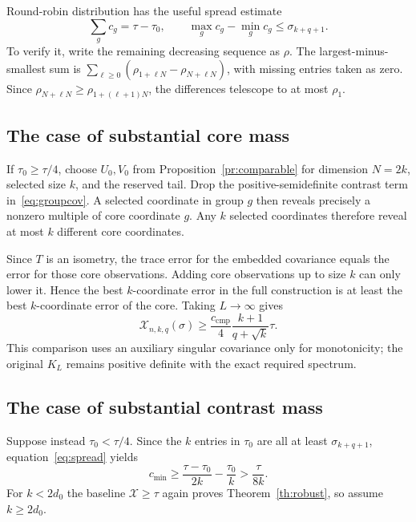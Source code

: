 \documentclass[11pt]{article}
\theoremstyle{remark}\newtheorem{remark}[theorem]{Remark}
\newcommand{\X}{\mathcal X}
\begin{document}
Round-robin distribution has the useful spread estimate
\begin{equation}\label{eq:spread}
 \sum_g c_g=\tau-\tau_0,
 \qquad \max_g c_g-\min_g c_g\le\sigma_{k+q+1}.
\end{equation}
To verify it, write the remaining decreasing sequence as $\rho$. The largest-minus-smallest sum is $\sum_{\ell\ge0}(\rho_{1+\ell N}-\rho_{N+\ell N})$, with missing entries taken as zero. Since $\rho_{N+\ell N}\ge\rho_{1+(\ell+1)N}$, the differences telescope to at most $\rho_1$.

\subsection{The case of substantial core mass}
If $\tau_0\ge\tau/4$, choose $U_0,V_0$ from Proposition~\ref{pr:comparable} for dimension $N=2k$, selected size $k$, and the reserved tail. Drop the positive-semidefinite contrast term in~\eqref{eq:groupcov}. A selected coordinate in group $g$ then reveals precisely a nonzero multiple of core coordinate $g$. Any $k$ selected coordinates therefore reveal at most $k$ different core coordinates.

Since $T$ is an isometry, the trace error for the embedded covariance equals the error for those core observations. Adding core observations up to size $k$ can only lower it. Hence the best $k$-coordinate error in the full construction is at least the best $k$-coordinate error of the core. Taking $L\to\infty$ gives
\begin{equation}\label{eq:corecase}
 \X_{n,k,q}(\sigma)
 \ge\frac{c_{\mathrm{cmp}}}{4}
 \frac{k+1}{q+\sqrt k}\tau.
\end{equation}
This comparison uses an auxiliary singular covariance only for monotonicity; the original $K_L$ remains positive definite with the exact required spectrum.

\subsection{The case of substantial contrast mass}
Suppose instead $\tau_0<\tau/4$. Since the $k$ entries in $\tau_0$ are all at least $\sigma_{k+q+1}$, equation~\eqref{eq:spread} yields
\begin{equation}\label{eq:cmin}
 c_{\min}\ge\frac{\tau-\tau_0}{2k}-\frac{\tau_0}{k}
 >\frac{\tau}{8k}.
\end{equation}
For $k<2d_0$ the baseline $\X\ge\tau$ again proves Theorem~\ref{th:robust}, so assume $k\ge2d_0$.
\end{document}

